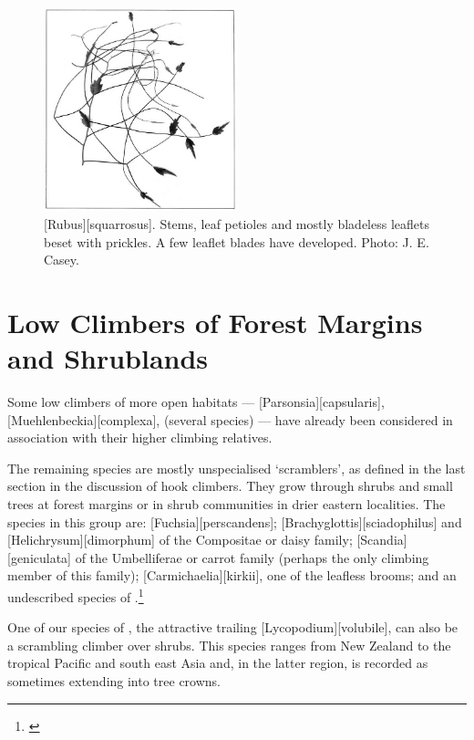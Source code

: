 \begin{figure}
	\includegraphics[width=0.5\textwidth]{graphics/figure37rubus.jpg}
	\centering
	\caption[\emph{Rubus squarrosus}]{[Rubus][squarrosus].
	Stems, leaf petioles and mostly bladeless leaflets beset with prickles.
	A few leaflet blades have developed.
	Photo: J. E. Casey.}%
	\label{fig:37rubus}
\end{figure}

\section{Low Climbers of Forest Margins and Shrublands}

Some low climbers of more open habitats --- [Parsonsia][capsularis], [Muehlenbeckia][complexa],  (several species) --- have already been considered in association with their higher climbing relatives.

The remaining species are mostly unspecialised `scramblers', as defined in the last section in the discussion of hook climbers.
They grow through shrubs and small trees at forest margins or in shrub communities in drier eastern localities.
The species in this group are: [Fuchsia][perscandens]; [Brachyglottis][sciadophilus] and [Helichrysum][dimorphum] of the Compositae or daisy family; [Scandia][geniculata] of the Umbelliferae or carrot family (perhaps the only climbing member of this family); [Carmichaelia][kirkii], one of the leafless brooms; and an undescribed species of .\footnote{\cite{eagle1982trees}}

One of our species of , the attractive trailing [Lycopodium][volubile], can also be a scrambling climber over shrubs.
This species ranges from New Zealand to the tropical Pacific and south east Asia and, in the latter region, is recorded as sometimes extending into tree crowns.

